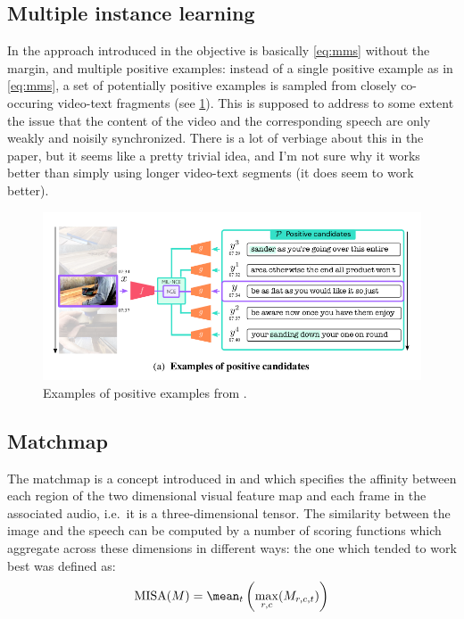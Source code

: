 \subsection{Multiple instance learning}
In the approach introduced in \citet{miech2020end} the objective is
basically \cref{eq:mms} without the margin, and multiple positive
examples: instead of a single positive example as in \cref{eq:mms}, a
set of potentially positive examples is sampled from closely
co-occuring video-text fragments (see \cref{fig:positive}). This is
supposed to address to some extent the issue that the content of the
video and the corresponding speech are only weakly and noisily
synchronized. There is a lot of verbiage about this in the paper, but
it seems like a pretty trivial idea, and I'm not sure why it works
better than simply using longer video-text segments (it does seem to
work better).
\begin{figure}
  \centering
  \includegraphics[scale=0.3]{positive}
  \caption{Examples of positive examples from \citet{miech2020end}.}
  \label{fig:positive}
\end{figure}

\subsection{Matchmap}
The matchmap is a concept introduced in \citet{harwath2018jointly} and
which specifies the affinity between each region of the two
dimensional visual feature map and each frame in the associated audio,
i.e.\ it is a three-dimensional tensor. The similarity between the
image and the speech can be computed by a number of scoring functions
which aggregate across these dimensions in different ways: the one
which tended to work best was defined as:
\begin{equation}
  \label{eq:misa}
  \mathrm{MISA}(M) = \mean_t \left(\max_{r,c}(M_{r,c,t})\right)
\end{equation}

